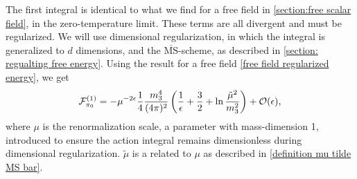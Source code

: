 %
The first integral is identical to what we find for a free field in \autoref{section:free scalar field}, in the zero-temperature limit.
These terms are all divergent and must be regularized.
We will use dimensional regularization, in which the integral is generalized to $d$ dimensions, and the $\overline{\mathrm{MS}}$-scheme, as described in \autoref{section: regualting free energy}.
Using the result for a free field \autoref{free field regularized energy}, we get
%
\begin{equation}
    \label{Free energy pi 0}
    \mathcal{F}^{(1)}_{\pi_0} 
    = 
    - \mu^{-2 \epsilon}  \frac{1}{4} \frac{m_3^4}{(4\pi)^2} 
    \left( \frac{1}{\epsilon} + \frac{3}{2} + \ln \frac{\tilde \mu^2}{m_3^2} \right)
    + \mathcal{O}(\epsilon),
\end{equation}
%
where $\mu$ is the renormalization scale, a parameter with mass-dimension 1, introduced to ensure the action integral remains dimensionless during dimensional regularization.
$\tilde \mu$ is a related to $\mu$ as described in \autoref{definition mu tilde MS bar}.

